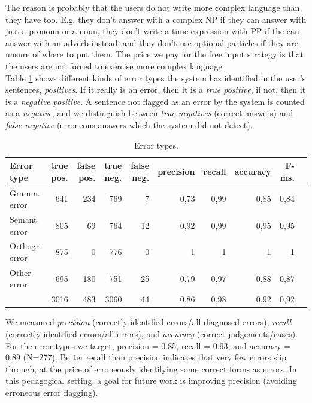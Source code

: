 \documentclass[11pt]{article}
\begin{document}
The reason is probably that the users do not write more complex language than they have too. E.g. they don't answer with a complex NP if they can answer with just a pronoun or a noun, they don't write a time-expression with PP if the can answer with an adverb instead, and they don't use optional particles if they are unsure of where to put them. The price we pay for the free input strategy is that the users are not forced to exercise more complex language. \\

Table \ref{errortypes} shows different kinds of error types the system has identified in the user's sentences, \textit{positives}. If it really is an error, then it is a \textit{true positive}, if not, then it is a \textit{negative positive}. A sentence not flagged as an error by the system is counted as a \textit{negative}, and we distinguish between \textit{true negatives} (correct answers) and \textit{false negative} (erroneous answers which the system did not detect). \\

\begin{table}[hbtp]
\begin{center}
\begin{tabular}{|l|r|r|r|r||r|r|r|r|r|}
\hline
Error type	& true pos.		& false pos.		& true neg.		& false neg.	& precision	 & recall	& accuracy	& F-ms. \\
\hline
Gramm. error    &   641   &   234   &   769    &   7    &   0,73   &   0,99   &   0,85   &   0,84	  \\
Semant. error       &   805   &   69    &   764    &   12   &   0,92   &   0,99   &   0,95   &   0,95		  \\
Orthogr. error      &   875   &   0     &   776    &   0    &   1      &   1      &   1      &   1					  \\
Other error     &   695   &   180   &   751    &   25   &   0,79   &   0,97   &   0,88   &   0,87	  \\
\hline
  &   3016  &   483   &   3060   &   44   &   0,86   &   0,98   &   0,92   &   0,92			  \\
\hline
\end{tabular}
\caption{Error types.}
\label{errortypes}
\end{center}
\end{table}%

We measured \textit{precision} (correctly identified errors/all diagnosed errors), \textit{recall} (correctly identified errors/all errors), and \textit{accuracy} (correct judgements/cases). For the error types we target, precision = 0.85, recall = 0.93, and accuracy = 0.89 (N=277). Better recall than precision indicates that very few errors slip through, at the price of erroneously identifying some correct forms as errors. In this pedagogical setting, a goal for future work is improving precision (avoiding erroneous error flagging).
\end{document}
